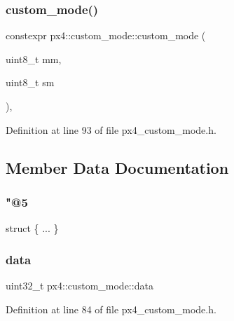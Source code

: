 \subsubsection{\texorpdfstring{custom\_mode()}{custom\_mode()}\hspace{0.1cm}{\footnotesize\ttfamily [3/3]}}
{\footnotesize\ttfamily constexpr px4\+::custom\+\_\+mode\+::custom\+\_\+mode (\begin{DoxyParamCaption}\item[{uint8\+\_\+t}]{mm,  }\item[{uint8\+\_\+t}]{sm }\end{DoxyParamCaption})\hspace{0.3cm}{\ttfamily [inline]}, {\ttfamily [constexpr]}}



Definition at line 93 of file px4\+\_\+custom\+\_\+mode.\+h.



\subsection{Member Data Documentation}
\mbox{\label{unionpx4_1_1custom__mode_a7e2a10cc8b47838e5f78b35e26e43ab0}} 
\subsubsection{\texorpdfstring{"@5}{@5}}
{\footnotesize\ttfamily struct \{ ... \} }

\mbox{\label{unionpx4_1_1custom__mode_aa8037fb2c1d5c975f1c6350ad3d05015}} 
\subsubsection{\texorpdfstring{data}{data}}
{\footnotesize\ttfamily uint32\+\_\+t px4\+::custom\+\_\+mode\+::data}



Definition at line 84 of file px4\+\_\+custom\+\_\+mode.\+h.

\mbox{\label{unionpx4_1_1custom__mode_a8cd074211bd552fe05fba9f6d880c2e5}} 
